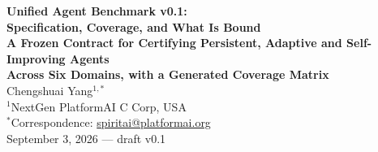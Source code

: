 \documentclass[11pt]{article}
\theoremstyle{definition}
\begin{document}
\begin{center}
{\LARGE\bfseries Unified Agent Benchmark v0.1:}\\[6pt]
{\LARGE\bfseries Specification, Coverage, and What Is Bound}\\[8pt]
{\large\bfseries A Frozen Contract for Certifying Persistent, Adaptive and Self-Improving Agents\\[2pt]
Across Six Domains, with a Generated Coverage Matrix}\\[16pt]
{\large Chengshuai Yang$^{1,*}$}\\[5pt]
{\normalsize $^{1}$NextGen PlatformAI C Corp, USA}\\[4pt]
{\normalsize $^{*}$Correspondence: \href{mailto:spiritai@platformai.org}{spiritai@platformai.org}}\\[10pt]
{\small September 3, 2026 --- draft v0.1}
\end{center}
\end{document}

